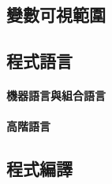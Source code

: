 \documentclass[12pt,a4paper,oneside]{report}
\begin{document}
\begin{CJK}{UTF8}{bkai}
\subsection{變數可視範圍}

\subsection{程式語言}

\paragraph{機器語言與組合語言}
\paragraph{高階語言}

\subsection{程式編譯}

\ifx \allfiles \undefined

\printindex

\clearpage
\end{CJK}
\end{document}
